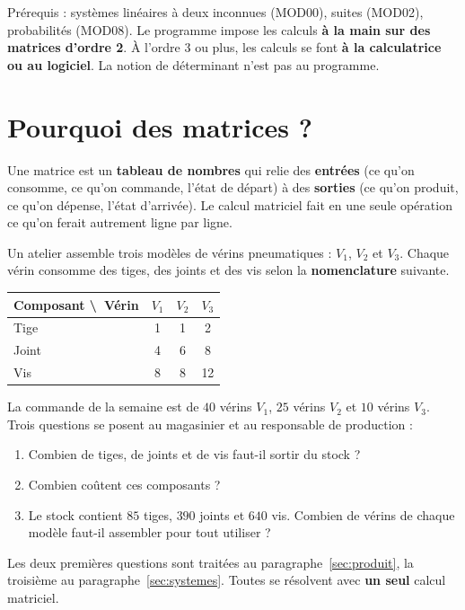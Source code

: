 \documentclass[a4paper,11pt]{article}
\begin{document}
\begin{remarque}
Prérequis : systèmes linéaires à deux inconnues (MOD00), suites (MOD02), probabilités (MOD08). Le programme impose les calculs \textbf{à la main sur des matrices d'ordre 2}. À l'ordre 3 ou plus, les calculs se font \textbf{à la calculatrice ou au logiciel}. La notion de déterminant n'est pas au programme.
\end{remarque}

\newpage
\tableofcontents
\newpage

\needspace{7cm}
\section{Pourquoi des matrices ?}\label{sec:pourquoi}

\begin{tcolorbox}[colback=uimmlightblue!30, colframe=uimmblue, boxrule=0.8pt, arc=3pt,
  title={\textbf{\textsf{L'essentiel en une phrase}}}, fonttitle=\bfseries\color{white}, coltitle=white]
Une matrice est un \textbf{tableau de nombres} qui relie des \textbf{entrées} (ce qu'on consomme, ce qu'on commande, l'état de départ) à des \textbf{sorties} (ce qu'on produit, ce qu'on dépense, l'état d'arrivée). Le calcul matriciel fait en une seule opération ce qu'on ferait autrement ligne par ligne.
\end{tcolorbox}

\begin{appliindus}\label{ex:filrouge}
Un atelier assemble trois modèles de vérins pneumatiques : $V_1$, $V_2$ et $V_3$. Chaque vérin consomme des tiges, des joints et des vis selon la \textbf{nomenclature} suivante.
\begin{center}
\renewcommand{\arraystretch}{1.3}
\begin{tabular}{|l|c|c|c|}
\hline
\rowcolor{uimmlightblue}
\textbf{Composant} \textbackslash\ \textbf{Vérin} & $V_1$ & $V_2$ & $V_3$ \\
\hline
Tige & 1 & 1 & 2 \\
\hline
Joint & 4 & 6 & 8 \\
\hline
Vis & 8 & 8 & 12 \\
\hline
\end{tabular}
\end{center}
La commande de la semaine est de $40$ vérins $V_1$, $25$ vérins $V_2$ et $10$ vérins $V_3$. Trois questions se posent au magasinier et au responsable de production :
\begin{enumerate}
  \item Combien de tiges, de joints et de vis faut-il sortir du stock ?
  \item Combien coûtent ces composants ?
  \item Le stock contient $85$ tiges, $390$ joints et $640$ vis. Combien de vérins de chaque modèle faut-il assembler pour tout utiliser ?
\end{enumerate}
Les deux premières questions sont traitées au paragraphe~\ref{sec:produit}, la troisième au paragraphe~\ref{sec:systemes}. Toutes se résolvent avec \textbf{un seul} calcul matriciel.
\end{appliindus}
\end{document}
